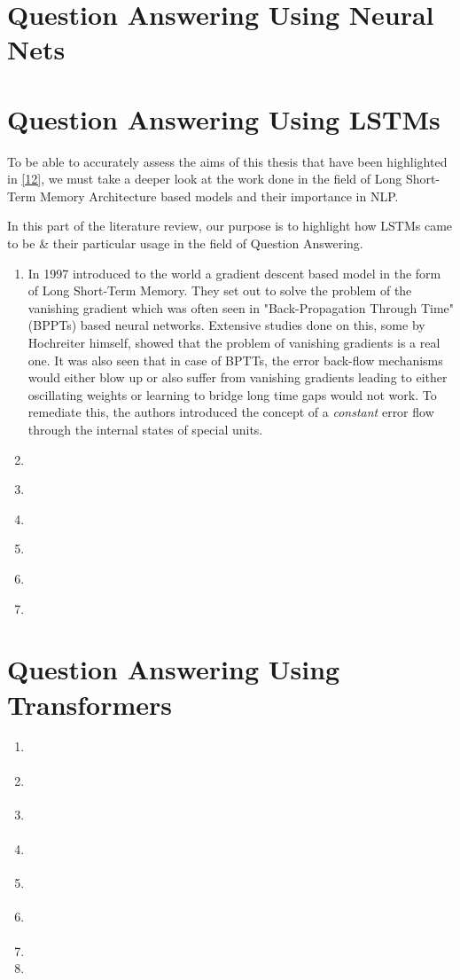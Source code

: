 \documentclass[12pt]{report}
\begin{document}
        \section{Question Answering Using Neural Nets}\label{21}
        \section{Question Answering Using LSTMs}\label{22}
        To be able to accurately assess the aims of this thesis that have been highlighted in \ref{12}, we must take a deeper look at the work done in the field of Long Short-Term Memory Architecture based models and their importance in NLP.

        In this part of the literature review, our purpose is to highlight how LSTMs came to be \& their particular usage in the field of Question Answering.
        \begin{enumerate}
            \item   In 1997 \cite{lstmoriginal} introduced to the world a gradient descent based model in the form of Long Short-Term Memory. They set out to solve the problem of the vanishing gradient which was often seen in "Back-Propagation Through Time"(BPPTs) based neural networks. Extensive studies done on this, some by Hochreiter himself, showed that the problem of vanishing gradients is a real one. It was also seen that in case of BPTTs, the error back-flow mechanisms would either blow up or also suffer from vanishing gradients leading to either oscillating weights or learning to bridge long time gaps would not work. To remediate this, the authors introduced the concept of a \textit{constant} error flow through the internal states of special units.
            \item \cite{lstm}
            \item   \cite{schmid}
            \item  \cite{lstmhaighextractive}
            \item \cite{lstmhu2016question}
            \item   \cite{lstmintent}
            \item \cite{fastQA}


        \end{enumerate}

        \section{Question Answering Using Transformers}\label{23}
            \begin{enumerate}
                \item \cite{atayl}
                \item \cite{bert}
                \item \cite{albert}
                \item \cite{roberta}
                \item \cite{distil}
                \item \cite{squad}
                \item
                \item
            \end{enumerate}
\end{document}
